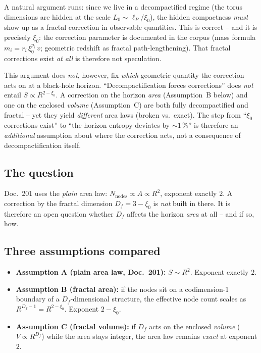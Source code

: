 A natural argument runs: since we live in a decompactified regime (the torus
dimensions are hidden at the scale $L_0 \sim \ell_P/\xi_0$), the hidden
compactness \emph{must} show up as a fractal correction in observable
quantities. This is correct -- and it is precisely $\xi_0$: the correction
parameter is documented in the corpus (mass formula $m_i =
r_i\,\xi_0^{p_i}\,v$; geometric redshift as fractal path-lengthening). That
fractal corrections exist \emph{at all} is therefore not speculation.

\medskip

\noindent
This argument does \emph{not}, however, fix \emph{which} geometric quantity
the correction acts on at a black-hole horizon. \enquote{Decompactification
forces corrections} does \emph{not} entail $S \propto R^{2-\xi_0}$. A
correction on the horizon \emph{area} (Assumption~B below) and one on the
enclosed \emph{volume} (Assumption~C) are both fully decompactified and
fractal -- yet they yield \emph{different} area laws (broken vs.\ exact). The
step from \enquote{$\xi_0$ corrections exist} to \enquote{the horizon entropy
deviates by ${\sim}1\,\%$} is therefore an \emph{additional} assumption about
where the correction acts, not a consequence of decompactification itself.

\subsection*{The question}

Doc.~201 uses the \emph{plain} area law: $N_{\text{nodes}} \propto A \propto
R^2$, exponent exactly $2$. A correction by the fractal dimension $D_f = 3 -
\xi_0$ is \emph{not} built in there. It is therefore an open question whether
$D_f$ affects the horizon \emph{area} at all -- and if so, how.

\subsection*{Three assumptions compared}

\begin{itemize}
  \item \textbf{Assumption A (plain area law, Doc.~201):}
        $S \sim R^{2}$. Exponent exactly $2$.
  \item \textbf{Assumption B (fractal area):} if the nodes sit on a
        codimension-1 boundary of a $D_f$-dimensional structure, the
        effective node count scales as $R^{D_f - 1} = R^{2-\xi_0}$.
        Exponent $2 - \xi_0$.
  \item \textbf{Assumption C (fractal volume):} if $D_f$ acts on the enclosed
        \emph{volume} ($V \propto R^{D_f}$) while the area stays integer, the
        area law remains \emph{exact} at exponent $2$.
\end{itemize}

